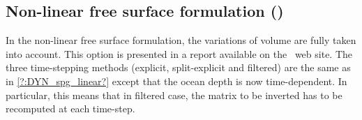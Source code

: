 \documentclass[../main/NEMO_manual]{subfiles}
\begin{document}
\subsection[Non-linear free surface formulation (\texttt{\textbf{key\_vvl}})]{Non-linear free surface formulation (\protect{})}
\label{subsec:MBZ_dyn_spg_vvl}

In the non-linear free surface formulation, the variations of volume are fully taken into account.
This option is presented in a report \citep{levier.treguier.ea_trpt07} available on the \NEMO\ web site.
The three time-stepping methods (explicit, split-explicit and filtered) are the same as in
\autoref{?:DYN_spg_linear?} except that the ocean depth is now time-dependent.
In particular, this means that in filtered case, the matrix to be inverted has to be recomputed at each time-step.

\subinc{}
\end{document}
